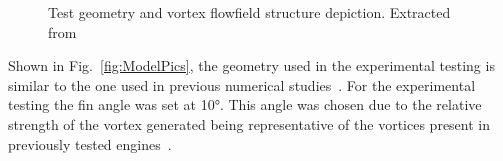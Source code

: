 \documentclass{AIAA}
\begin{document}


\begin{figure}[h]
\center
\caption{Test geometry and vortex flowfield structure depiction. Extracted from~\cite{JSASS_paper}}  
\label{fig:Vortex_Sketches}	
\end{figure}


\hfill\newline


Shown in Fig.~\ref{fig:ModelPics}, the geometry used in the experimental testing is similar to the one used in previous numerical studies~\cite{SpacePlanes_paper2015,AFMCpaper2014,JSASS_paper,Llobet_PlumeElongation}.
For the experimental testing the fin angle was set at \ang{10}.
This angle was chosen due to the relative strength of the vortex generated being representative of the vortices present in previously tested engines~\cite{AFMCpaper2014,SpacePlanes_paper2015}.
\end{document}
